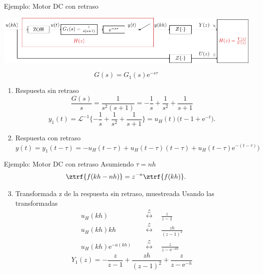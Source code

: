 \documentclass[presentation,aspectratio=169]{beamer}
\begin{document}
\begin{frame}[label={sec:org0ec1399}]{Ejemplo: Motor DC con retraso}
\begin{center}
\includegraphics[width=0.89\linewidth]{../../figures/invariant-sampling-dcmotor.pdf}
\end{center}
\[ G(s) = G_1(s)\mathrm{e}^{-s\tau}\]

\begin{enumerate}
\item \alert{Respuesta sin retraso} \[ \frac{G(s)}{s} = \frac{1}{s^2(s+1)} = -\frac{1}{s} + \frac{1}{s^2} + \frac{1}{s+1} \]
\[ y_1(t) = \mathcal{L}^{-1} \{-\frac{1}{s} + \frac{1}{s^2} + \frac{1}{s+1}\} = u_H(t)\big(t-1+\mathrm{e}^{-t}\big).\]
\item \alert{Respuesta con retraso} \(y(t) = y_1(t-\tau) =  -u_H(t-\tau) + u_H(t-\tau)(t-\tau) + u_H(t-\tau)\mathrm{e}^{-(t-\tau)}\big)\)
\end{enumerate}
\end{frame}

\begin{frame}[label={sec:org6a28296}]{Ejemplo: Motor DC con retraso}
Asumiendo \(\tau = nh\)
\[ \ztrf{f(kh-nh)} = z^{-n}\ztrf{f(kh)}.\]
\begin{enumerate}
\setcounter{enumi}{2}
\item \alert{Transformada z de la respuesta sin retraso, muestreada} 
Usando las transformadas
\begin{align*}
u_H(kh) \quad &\overset{\mathcal{Z}}{\longleftrightarrow} \quad \frac{z}{z-1}\\
u_H(kh)kh \quad &\overset{\mathcal{Z}}{\longleftrightarrow} \quad \frac{zh}{(z-1)^2}\\
u_H(kh)\mathrm{e}^{-a(kh)} \quad &\overset{\mathcal{Z}}{\longleftrightarrow} \quad \frac{z}{z-\mathrm{e}^{-ah}}
\end{align*}
\[Y_1(z) = -\frac{z}{z-1} + \frac{zh}{(z-1)^2} + \frac{z}{z-\mathrm{e}^{-h}}\]
\end{enumerate}
\end{frame}
\end{document}
